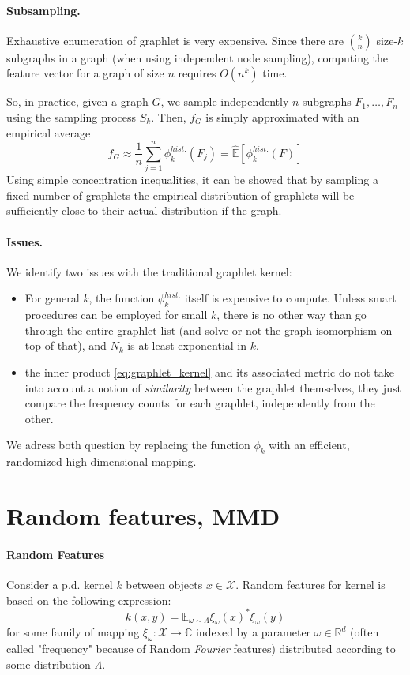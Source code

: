 \documentclass{article}
\begin{document}
\paragraph{Subsampling.} Exhaustive enumeration of graphlet is very expensive. Since there are $\binom{k}{n}$ size-$k$ subgraphs in a graph (when using independent node sampling), computing the feature vector for a graph of size $n$ requires $O(n^k)$ time.

So, in practice, given a graph $G$, we sample independently $n$ subgraphs $F_1, \ldots, F_n$ using the sampling process $S_k$. Then, $f_G$ is simply approximated with an empirical average
\begin{equation}\label{eq:graphlet_kernel_approx}
f_G \approx \frac{1}{n} \sum_{j=1}^n \phi_k^{hist.}(F_j) = \hat{\mathbb{E}}[\phi_k^{hist.}(F)]
\end{equation}
Using simple concentration inequalities, it can be showed \cite{Weissman} that by sampling a fixed number of graphlets the empirical distribution of graphlets will be sufficiently close to their actual distribution if the graph.

\paragraph{Issues.} We identify two issues with the traditional graphlet kernel:
\begin{itemize}
\item For general $k$, the function $\phi_k^{hist.}$ itself is expensive to compute. Unless smart procedures can be employed for small $k$, there is no other way than go through the entire graphlet list (and solve or not the graph isomorphism on top of that), and $N_k$ is at least exponential in $k$.
\item the inner product \eqref{eq:graphlet_kernel} and its associated metric do not take into account a notion of \emph{similarity} between the graphlet themselves, they just compare the frequency counts for each graphlet, independently from the other.
\end{itemize}
We adress both question by replacing the function $\phi_k$ with an efficient, randomized high-dimensional mapping.

\section{Random features, MMD}

\paragraph{Random Features} Consider a p.d. kernel $k$ between objects $x \in\mathcal{X}$. Random features for kernel is based on the following expression:
\begin{equation}\label{eq:RF}
k(x,y) = \mathbb{E}_{\omega \sim \Lambda} \xi_\omega(x)^* \xi_\omega(y)
\end{equation}
for some family of mapping $\xi_\omega:\mathcal{X} \to \mathbb{C}$ indexed by a parameter $\omega \in \mathbb{R}^d$ (often called "frequency" because of Random \emph{Fourier} features) distributed according to some distribution $\Lambda$.
\end{document}
